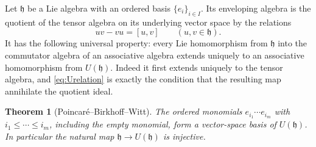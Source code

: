 \documentclass[11pt]{article}
\numberwithin{equation}{section}
\newtheorem{theorem}{Theorem}[section]
\theoremstyle{definition}
\theoremstyle{remark}
\newcommand{\h}{\mathfrak{h}}
\begin{document}
Let $\h$ be a Lie algebra with an ordered basis $\{e_i\}_{i\in I}$.
Its enveloping algebra is the quotient of the tensor algebra on
its underlying vector space by the relations
\begin{equation}\label{eq:Urelation}
 uv-vu=[u,v]\qquad(u,v\in\h).
\end{equation}
It has the following universal property: every Lie homomorphism
from $\h$ into the commutator algebra of an associative algebra
extends uniquely to an associative homomorphism from $U(\h)$.
Indeed it first extends uniquely to the tensor algebra, and
\eqref{eq:Urelation} is exactly the condition that the resulting
map annihilate the quotient ideal.

\begin{theorem}[Poincar\'e--Birkhoff--Witt]\label{thm:pbw}
The ordered monomials
$e_{i_1}\cdots e_{i_m}$ with $i_1\leq\cdots\leq i_m$, including
the empty monomial, form a vector-space basis of $U(\h)$.
In particular the natural map $\h\to U(\h)$ is injective.
\end{theorem}
\end{document}
